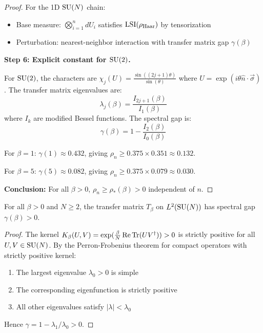 \begin{proof}
For the 1D $\mathrm{SU}(N)$ chain:
\begin{itemize}
\item Base measure: $\bigotimes_{i=1}^n dU_i$ satisfies $\operatorname{LSI}(\rho_{\mathrm{Haar}})$ by tensorization
\item Perturbation: nearest-neighbor interaction with transfer matrix gap $\gamma(\beta)$
\end{itemize}

\textbf{Step 6: Explicit constant for $\mathrm{SU}(2)$.}

For $\mathrm{SU}(2)$, the characters are $\chi_j(U) = \frac{\sin((2j+1)\theta)}{\sin(\theta)}$ where 
$U = \exp(i\theta \hat{n}\cdot\vec{\sigma})$. The transfer matrix eigenvalues are:
\[
\lambda_j(\beta) = \frac{I_{2j+1}(\beta)}{I_1(\beta)}
\]
where $I_k$ are modified Bessel functions. The spectral gap is:
\[
\gamma(\beta) = 1 - \frac{I_2(\beta)}{I_0(\beta)}
\]

For $\beta = 1$: $\gamma(1) \approx 0.432$, giving $\rho_n \geq 0.375 \times 0.351 \approx 0.132$.

For $\beta = 5$: $\gamma(5) \approx 0.082$, giving $\rho_n \geq 0.375 \times 0.079 \approx 0.030$.

\textbf{Conclusion:} For all $\beta > 0$, $\rho_n \geq \rho_*(\beta) > 0$ independent of $n$.
\end{proof}

\begin{lemma}
\label{lem:transfer-gap-positive}
For all $\beta > 0$ and $N \geq 2$, the transfer matrix $T_\beta$ on $L^2(\mathrm{SU}(N))$ 
has spectral gap $\gamma(\beta) > 0$.
\end{lemma}

\begin{proof}
The kernel $K_\beta(U, V) = \exp(\frac{\beta}{N}\operatorname{Re}\operatorname{Tr}(UV^\dagger)) > 0$ is 
strictly positive for all $U, V \in \mathrm{SU}(N)$. By the Perron-Frobenius theorem 
for compact operators with strictly positive kernel:
\begin{enumerate}
\item The largest eigenvalue $\lambda_0 > 0$ is simple
\item The corresponding eigenfunction is strictly positive
\item All other eigenvalues satisfy $|\lambda| < \lambda_0$
\end{enumerate}
Hence $\gamma = 1 - \lambda_1/\lambda_0 > 0$.
\end{proof}

